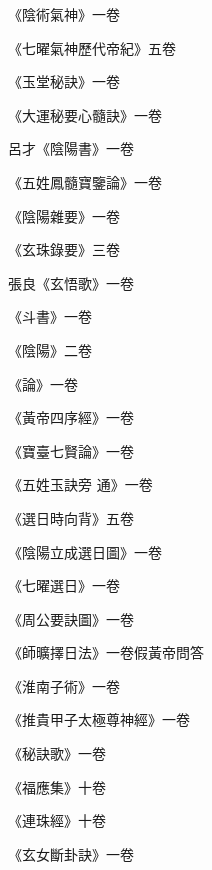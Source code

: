 \begin{pinyinscope}
 《陰術氣神》一卷



 《七曜氣神歷代帝紀》五卷



 《玉堂秘訣》一卷



 《大運秘要心髓訣》一卷



 呂才《陰陽書》一卷



 《五姓鳳髓寶鑒論》一卷



 《陰陽雜要》一卷



 《玄珠錄要》三卷



 張良《玄悟歌》一卷



 《斗書》一卷



 《陰陽》二卷



 《論》一卷



 《黃帝四序經》一卷



 《寶臺七賢論》一卷



 《五姓玉訣旁
 通》一卷



 《選日時向背》五卷



 《陰陽立成選日圖》一卷



 《七曜選日》一卷



 《周公要訣圖》一卷



 《師曠擇日法》一卷假黃帝問答



 《淮南子術》一卷



 《推貴甲子太極尊神經》一卷



 《秘訣歌》一卷



 《福應集》十卷



 《連珠經》十卷



 《玄女斷卦訣》一卷




\end{pinyinscope}
